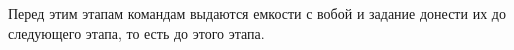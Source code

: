 \par Перед этим этапам командам выдаются емкости с вобой и задание донести их до следующего этапа, то есть до этого этапа.